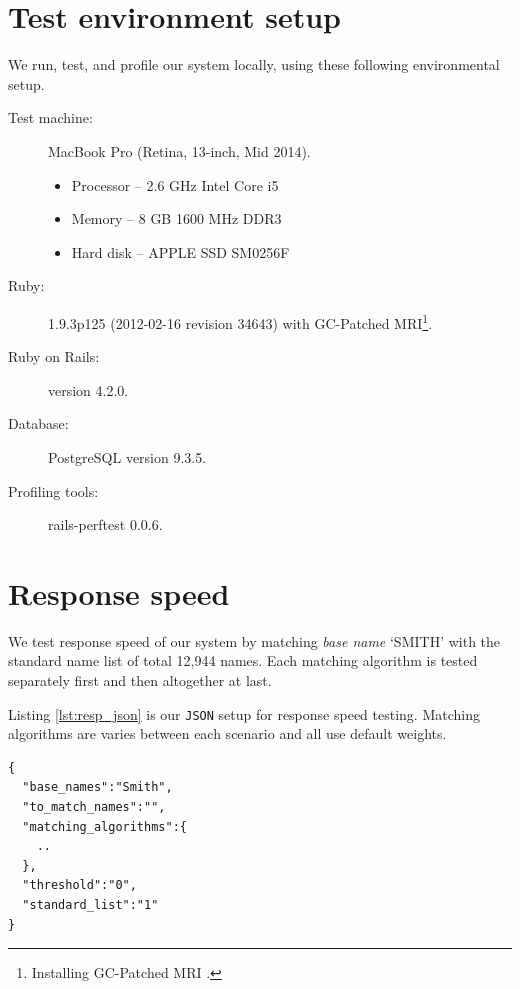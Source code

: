 \section{Test environment setup}

We run, test, and profile our system locally, using these following
environmental setup.

\begin{description}
  \item[Test machine:] MacBook Pro (Retina, 13-inch, Mid 2014).
    \begin{itemize}
      \item Processor -- 2.6 GHz Intel Core i5
      \item Memory -- 8 GB 1600 MHz DDR3
      \item Hard disk -- APPLE SSD SM0256F
    \end{itemize}
  \item[Ruby:] 1.9.3p125 (2012-02-16 revision 34643) with
    GC-Patched MRI\footnote{Installing GC-Patched MRI \cite[]{perftest}.}.
  \item[Ruby on Rails:] version 4.2.0.
  \item[Database:] PostgreSQL version 9.3.5.
  \item[Profiling tools:] rails-perftest \cite[]{perftest} 0.0.6.
\end{description}

\section{Response speed}

We test response speed of our system by matching \emph{base name} `SMITH'
with the standard name list of total 12,944 names. Each matching algorithm
is tested separately first and then altogether at last.

Listing \ref{lst:resp_json} is our \texttt{JSON} setup for response speed
testing. Matching algorithms are varies between each scenario
and all use default weights.

\begin{minipage}{\linewidth}
  \begin{lstlisting}[label={lst:resp_json}, caption={\texttt{JSON} setup for performance testing.}]
{
  "base_names":"Smith",
  "to_match_names":"",
  "matching_algorithms":{
    ..
  },
  "threshold":"0",
  "standard_list":"1"
}
\end{lstlisting}
\end{minipage}

